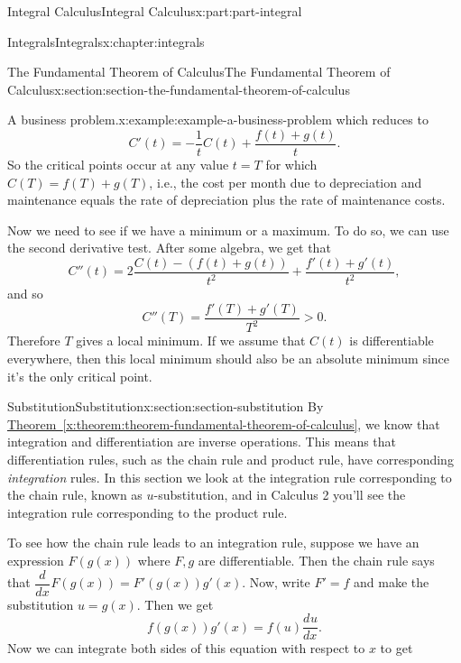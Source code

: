 \documentclass[twoside,10pt,]{book}
\newcommand{\xreffont}{\relax}
\numberwithin{equation}{part}
\newcommand{\dv}[3][]{\dfrac{d^{#1} #2}{d #3^{#1}}}
\begin{document}
\begin{partptx}{Integral Calculus}{}{Integral Calculus}{}{}{x:part:part-integral}
\begin{chapterptx}{Integrals}{}{Integrals}{}{}{x:chapter:integrals}
\begin{sectionptx}{The Fundamental Theorem of Calculus}{}{The Fundamental Theorem of Calculus}{}{}{x:section:section-the-fundamental-theorem-of-calculus}
\begin{example}{A business problem.}{x:example:example-a-business-problem}
which reduces to%
\begin{equation*}
C'(t) = -\frac{1}{t}C(t) + \frac{f(t) + g(t)}{t}.
\end{equation*}
So the critical points occur at any value \(t = T\) for which \(C(T) = f(T) + g(T)\), i.e., the cost per month due to depreciation and maintenance equals the rate of depreciation plus the rate of maintenance costs.%
\par
Now we need to see if we have a minimum or a maximum. To do so, we can use the second derivative test. After some algebra, we get that%
\begin{equation*}
C''(t) = 2\frac{C(t) - (f(t) + g(t))}{t^{2}} + \frac{f'(t) + g'(t)}{t^{2}},
\end{equation*}
and so%
\begin{equation*}
C''(T) = \frac{f'(T) + g'(T)}{T^{2}} >0.
\end{equation*}
Therefore \(T\) gives a local minimum. If we assume that \(C(t)\) is differentiable everywhere, then this local minimum should also be an absolute minimum since it's the only critical point.%
\end{example}
\end{sectionptx}
%
%
\typeout{************************************************}
\typeout{************************************************}
%
\begin{sectionptx}{Substitution}{}{Substitution}{}{}{x:section:section-substitution}
By \hyperref[x:theorem:theorem-fundamental-theorem-of-calculus]{Theorem~{\xreffont\ref{x:theorem:theorem-fundamental-theorem-of-calculus}}}, we know that integration and differentiation are inverse operations. This means that differentiation rules, such as the chain rule and product rule, have corresponding \emph{integration} rules. In this section we look at the integration rule corresponding to the chain rule, known as \(u\)-substitution, and in Calculus 2 you'll see the integration rule corresponding to the product rule.%
\par
To see how the chain rule leads to an integration rule, suppose we have an expression \(F(g(x))\) where \(F,g\) are differentiable. Then the chain rule says that \(\dv{}{x}F(g(x)) = F'(g(x))g'(x).\) Now, write \(F' = f\) and make the substitution \(u = g(x)\). Then we get%
\begin{equation*}
f(g(x))g'(x) = f(u)\dv{u}{x}.
\end{equation*}
Now we can integrate both sides of this equation with respect to \(x\) to get%
\begin{equation*}

\end{equation*}
\end{sectionptx}
\end{chapterptx}
\end{partptx}
\end{document}
